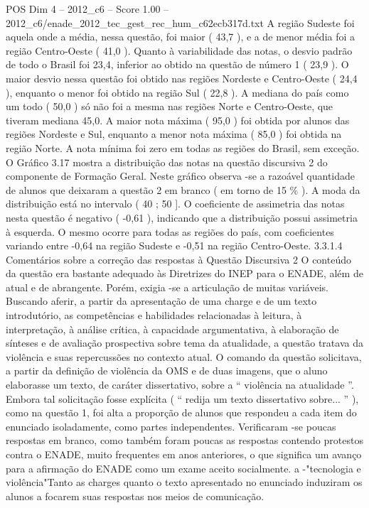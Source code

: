 \begin{textsample}{POS Dim 4 – 2012\_c6 – Score 1.00 – 2012\_c6/enade\_2012\_tec\_gest\_rec\_hum\_c62ecb317d.txt}
A região Sudeste foi aquela onde a média, nessa questão, foi maior ( 43,7 ), e a de menor média foi a região Centro-Oeste ( 41,0 ).
Quanto à variabilidade das notas, o desvio padrão de todo o Brasil foi 23,4, inferior ao obtido na questão de número 1 ( 23,9 ).
O maior desvio nessa questão foi obtido nas regiões Nordeste e Centro-Oeste ( 24,4 ), enquanto o menor foi obtido na região Sul ( 22,8 ).
A mediana do país como um todo ( 50,0 ) só não foi a mesma nas regiões Norte e Centro-Oeste, que tiveram mediana 45,0.
A maior nota máxima ( 95,0 ) foi obtida por alunos das regiões Nordeste e Sul, enquanto a menor nota máxima ( 85,0 ) foi obtida na região Norte.
A nota mínima foi zero em todas as regiões do Brasil, sem exceção.
O Gráfico 3.17 mostra a distribuição das notas na questão discursiva 2 do componente de Formação Geral.
Neste gráfico observa -se a razoável quantidade de alunos que deixaram a questão 2 em branco ( em torno de 15 \% ).
A moda da distribuição está no intervalo ( 40 ; 50 ].
O coeficiente de assimetria das notas nesta questão é negativo ( -0,61 ), indicando que a distribuição possui assimetria à esquerda.
O mesmo ocorre para todas as regiões do país, com coeficientes variando entre -0,64 na região Sudeste e -0,51 na região Centro-Oeste. 3.3.1.4 Comentários sobre a correção das respostas à Questão Discursiva 2 O conteúdo da questão era bastante adequado às Diretrizes do INEP para o ENADE, além de atual e de abrangente.
Porém, exigia -se a articulação de muitas variáveis.
Buscando aferir, a partir da apresentação de uma charge e de um texto introdutório, as competências e habilidades relacionadas à leitura, à interpretação, à análise crítica, à capacidade argumentativa, à elaboração de sínteses e de avaliação prospectiva sobre tema da atualidade, a questão tratava da violência e suas repercussões no contexto atual.
O comando da questão solicitava, a partir da definição de violência da OMS e de duas imagens, que o aluno elaborasse um texto, de caráter dissertativo, sobre a “ violência na atualidade ”.
Embora tal solicitação fosse explícita ( “ redija um texto dissertativo sobre... ” ), como na questão 1, foi alta a proporção de alunos que respondeu a cada item do enunciado isoladamente, como partes independentes.
Verificaram -se poucas respostas em branco, como também foram poucas as respostas contendo protestos contra o ENADE, muito frequentes em anos anteriores, o que significa um avanço para a afirmação do ENADE como um exame aceito socialmente. a -"tecnologia e violência"Tanto as charges quanto o texto apresentado no enunciado induziram os alunos a focarem suas respostas nos meios de comunicação.

\end{textsample}
